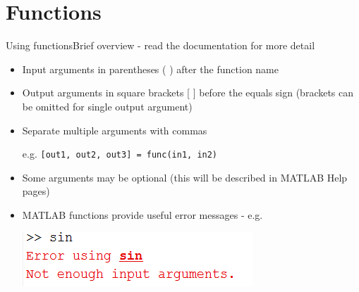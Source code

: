\documentclass{beamer}
\begin{document}
\section{Functions}

\begin{frame}{Using functions}{Brief overview - read the documentation for more detail}
	\begin{itemize}
		\item Input arguments in parentheses ( ) after the function name
		\item Output arguments in square brackets [ ] before the equals sign (brackets can be omitted for single output argument)
		\item Separate multiple arguments with commas
		
		e.g. \lstinline[style=Matlab-editor]![out1, out2, out3] = func(in1, in2)!
		\item Some arguments may be optional (this will be described in MATLAB Help pages)
		\item MATLAB functions provide useful error messages - e.g.
		
		\includegraphics[width=0.5\linewidth]{function_error}
	\end{itemize}
\end{frame}
\end{document}
